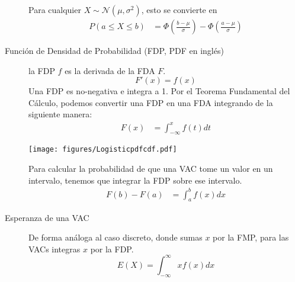 \documentclass[12,landscape]{article}
\newcommand{\N}{\mathcal{N}}
\begin{document}
\begin{multicols*}{3}
\begin{description}
Para cualquier $X \sim \N(\mu,\sigma^2)$, esto se convierte en
\begin{align*}
P(a\leq X\leq b)&=\Phi \left(\frac{b-\mu }{\sigma } \right) - \Phi \left( \frac{a-\mu }{\sigma } \right)
\end{align*}

\item[Función de Densidad de Probabilidad (FDP, PDF en inglés)] la FDP $f$ es la derivada de la FDA $F$.
\[ F'(x) = f(x) \]
Una FDP es no-negativa e integra a 1. Por el Teorema Fundamental del Cálculo, podemos convertir una FDP en una FDA integrando de la siguiente manera:
\begin{align*} 
    F(x) &=  \int_{-\infty}^x f(t)dt  
   \end{align*}
   \begin{minipage}{\linewidth}
            \centering
\texttt{[image: figures/Logisticpdfcdf.pdf]}
        \end{minipage}
   Para calcular la probabilidad de que una VAC tome un valor en un intervalo, tenemos que integrar la FDP sobre ese intervalo.
      \begin{align*} 
    F(b) - F(a)  &=  \int^b_a f(x)dx
       \end{align*}
   
\item[Esperanza de una VAC] De forma análoga al caso discreto, donde sumas $x$ por la FMP, para las VACs integras $x$ por la FDP.
\[E(X) = \int^\infty_{-\infty}xf(x)dx \]
\end{description}


\label{tei}

\end{multicols*}
\end{document}
